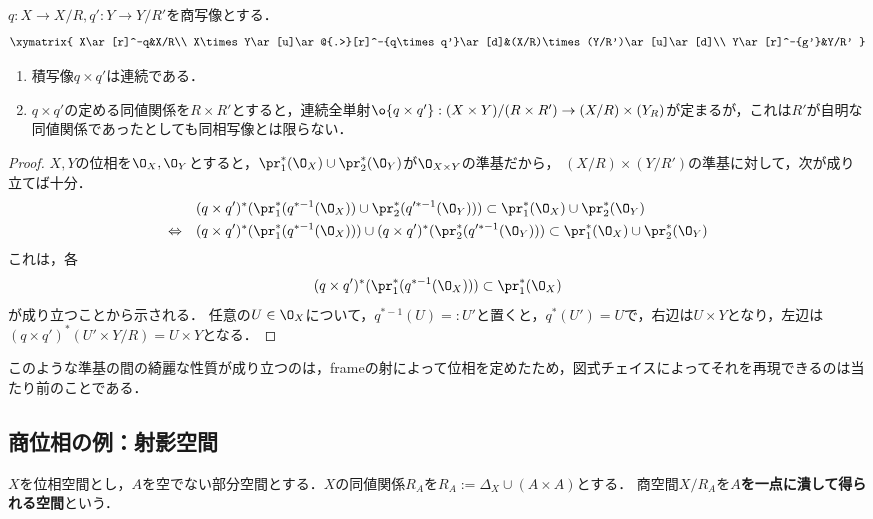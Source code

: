 \documentclass[uplatex,dvipdfmx]{jsreport}
\begin{document}
\begin{lemma}[積空間との関係]
    $q:X\to X/R,q':Y\to Y/R'$を商写像とする．
    \[\xymatrix{
        X\ar[r]^-q&X/R\\
        X\times Y\ar[u]\ar@{.>}[r]^-{q\times q'}\ar[d]&(X/R)\times(Y/R')\ar[u]\ar[d]\\
        Y\ar[r]^-{g'}&Y/R'
    }\]
    \begin{enumerate}
        \item 積写像$q\times q'$は連続である．
        \item $q\times q'$の定める同値関係を$R\times R'$とすると，連続全単射$\o{q\times q'}:(X\times Y)/(R\times R')\to(X/R)\times(Y_R)$が定まるが，これは$R'$が自明な同値関係であったとしても同相写像とは限らない．
    \end{enumerate}
\end{lemma}
\begin{proof}
    $X,Y$の位相を$\O_X,\O_Y$とすると，$\pr^*_1(\O_X)\cup\pr^*_2(\O_Y)$が$\O_{X\times Y}$の準基だから，
    $(X/R)\times(Y/R')$の準基に対して，次が成り立てば十分．
    \begin{align*}
        &(q\times q')^*(\pr_1^*(q^{*-1}(\O_X))\cup\pr_2^*(q'^{*-1}(\O_Y)))\subset\pr^*_1(\O_X)\cup\pr^*_2(\O_Y)\\
        \Leftrightarrow\quad&(q\times q')^*(\pr_1^*(q^{*-1}(\O_X)))\cup(q\times q')^*(\pr_2^*(q'^{*-1}(\O_Y)))\subset\pr^*_1(\O_X)\cup\pr^*_2(\O_Y)
    \end{align*}
    これは，各
    \[(q\times q')^*(\pr_1^*(q^{*-1}(\O_X)))\subset\pr^*_1(\O_X) \]
    が成り立つことから示される．
    任意の$U\in\O_X$について，$q^{*-1}(U)=:U'$と置くと，$q^*(U')=U$で，右辺は$U\times Y$となり，左辺は
    $(q\times q')^*(U'\times Y/R)=U\times Y$となる．
\end{proof}
\begin{remarks}
    このような準基の間の綺麗な性質が成り立つのは，frameの射によって位相を定めたため，図式チェイスによってそれを再現できるのは当たり前のことである．
\end{remarks}

\subsection{商位相の例：射影空間}

\begin{definition}[一点に潰して得られる空間]\label{def-一点に潰して得られる空間}
    $X$を位相空間とし，$A$を空でない部分空間とする．$X$の同値関係$R_A$を$R_A:=\Delta_X\cup (A\times A)$とする．
    商空間$X/R_A$を\textbf{$A$を一点に潰して得られる空間}という．
\end{definition}
\end{document}
